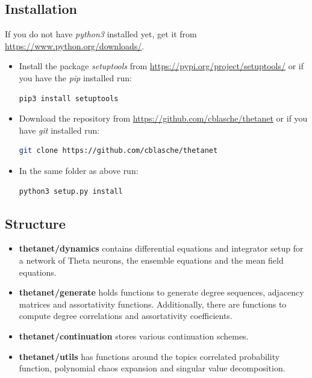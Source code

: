 \documentclass[bibliography=totoc, twoside]{article}
\numberwithin{equation}{section}
\begin{document}
\subsection*{Installation}
If you do not have \textit{python3} installed yet, get it from \url{https://www.python.org/downloads/}.
\begin{itemize}
    \item Install the package \textit{setuptools} from \url{https://pypi.org/project/setuptools/} or if you have the \textit{pip} installed run:
\begin{lstlisting}[language=Bash]
pip3 install setuptools
\end{lstlisting}
    \item Download the repository from \url{https://github.com/cblasche/thetanet} or if you have \textit{git} installed run:
\begin{lstlisting}[language=Bash]
git clone https://github.com/cblasche/thetanet
\end{lstlisting}
    \item In the same folder as above run:
\begin{lstlisting}[language=Bash]
python3 setup.py install
\end{lstlisting}
\end{itemize}


\subsection*{Structure}
\begin{itemize}
    \item \textbf{thetanet/dynamics} contains differential equations and integrator setup for a network of Theta neurons, the ensemble equations and the mean field equations.
    \item \textbf{thetanet/generate} holds functions to generate degree sequences, adjacency matrices and assortativity functions. Additionally, there are functions to compute degree correlations and assortativity coefficients.
    \item \textbf{thetanet/continuation} stores various continuation schemes.
    \item \textbf{thetanet/utils} has functions around the topics correlated probability function, polynomial chaos expansion and singular value decomposition.
\end{itemize}
\end{document}
